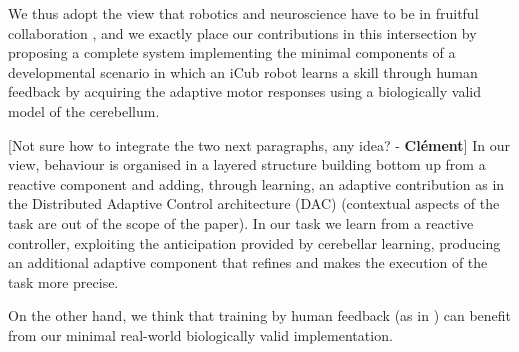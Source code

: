 \documentclass[letterpaper, 10 pt, conference]{ieeeconf}  %
\newcommand\jp[1]{{\color{red}}{\color{red}}{\footnotesize \color{red}[#1 - \textbf{Jordi}]}} %
\newcommand\cmf[1]{{\footnotesize \color{red}[#1 - \textbf{Cl\'ement}]}} %
\begin{document}
We thus adopt the view that robotics and neuroscience have to be in fruitful collaboration \cite{floreano2014robotics}, and we exactly place our contributions in this intersection by proposing a complete system implementing the minimal components of a developmental scenario in which an iCub robot learns a skill through human feedback by acquiring the adaptive motor responses using a biologically valid model of the cerebellum.

\cmf{Not sure how to integrate the two next paragraphs, any idea?}
In our view, behaviour is organised in a layered structure building bottom up from a reactive component and adding, through learning, an adaptive contribution as in the Distributed Adaptive Control architecture (DAC) \cite{verschure2003environmentally} (contextual aspects of the task are out of the scope of the paper). In our task we learn from a reactive controller, exploiting the anticipation provided by cerebellar learning, producing an additional adaptive component that refines and makes the execution of the task more precise. 

 
On the other hand, we think that training by human feedback (as in \cite{knox2013training}) can benefit from our minimal real-world biologically valid implementation.


%
\end{document}
